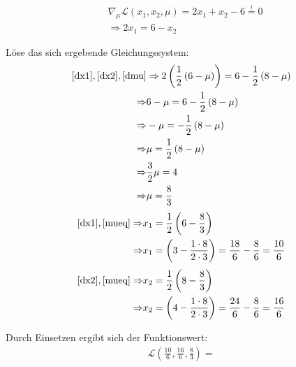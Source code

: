 \documentclass{article}
\begin{document}
\begin{equation}\label{dmu}
\begin{aligned}
    & \nabla_{\mu}\mathcal{L}(x_1,x_2,\mu) =2x_1+x_2-6 \overset{!}{=} 0 \\
& \Rightarrow 2x_1 = 6 - x_2
\end{aligned}
\end{equation}

Löse das sich ergebende Gleichungssystem:
\begin{equation}\label{mueq}
\begin{aligned}
    \eqref{dx1},\eqref{dx2},\eqref{dmu} &\Rightarrow 2\left( \frac{1}{2} \left(6 - \mu \right) \right) = 6 - \frac{1}{2} \left( 8-\mu \right)\\
    \Rightarrow & 6 - \mu  = 6 - \frac{1}{2} \left( 8-\mu \right)\\
    \Rightarrow &  - \mu  =  - \frac{1}{2} \left( 8-\mu \right)\\
    \Rightarrow &   \mu  =   \frac{1}{2} \left( 8-\mu \right)  \\
    \Rightarrow &   \frac{3}{2}\mu  =  4 \\
    \Rightarrow &   \mu  =  \frac{8}{3} \\
\end{aligned}
\end{equation}
\begin{equation}\label{x1eq}
\begin{aligned}
    \eqref{dx1},\eqref{mueq} \Rightarrow& x_1 = \frac{1}{2}\left(6-\frac{8}{3}\right)\\
    \Rightarrow & x_1 = \left(3-\frac{1 \cdot 8}{2\cdot 3}\right) = \frac{18}{6} -  \frac{8}{6} = \frac{10}{6}\\
\end{aligned}
\end{equation}
\begin{equation}\label{x2eq}
\begin{aligned}
    \eqref{dx2},\eqref{mueq} \Rightarrow& x_2 = \frac{1}{2}\left(8-\frac{8}{3}\right)\\
    \Rightarrow & x_2 = \left(4-\frac{1 \cdot 8}{2\cdot 3}\right) = \frac{24}{6} -  \frac{8}{6} = \frac{16}{6}\\
\end{aligned}
\end{equation}

Durch Einsetzen ergibt sich der Funktionswert:
\begin{equation}
\begin{aligned}
    \mathcal{L}\left(\frac{10}{6},\frac{16}{6},\frac{8}{3}\right) = 
\end{aligned}
\end{equation}
\end{document}
